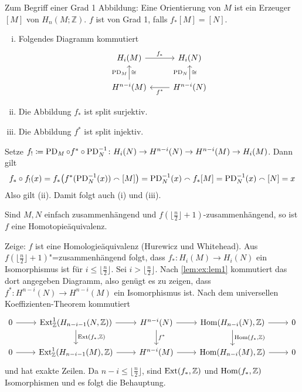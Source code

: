 \begin{erinnerung}
	Zum Begriff einer Grad 1 Abbildung: Eine Orientierung von $M$ ist ein Erzeuger $[M]$ von $H_n(M;\mathbb{Z})$. 
	$f$ ist von Grad 1, falls $f_*[M]=[N]$.
\end{erinnerung}

\begin{lemma}[label=lem:ex:lem1]
	\begin{enumerate}[(i)]
		\item Folgendes Diagramm kommutiert
		\[
			\begin{tikzcd}
				H_i(M) \rar["f_*"] & H_i(N) \\
				H^{n-i}(M) \uar["\PD_M","\cong"'] & H^{n-i}(N) \lar["f^*"] \uar["\PD_N","\cong"']
			\end{tikzcd}
		\]
		\item Die Abbildung $f_*$ ist split surjektiv.
		\item Die Abbildung $f^*$ ist split injektiv.
	\end{enumerate}
\end{lemma}
\begin{beweis}
	Setze $f_! \coloneqq \PD_M \circ f^* \circ  \PD^{-1}_N \colon H_i(N) \to H^{n-i}(N) \to H^{n-i}(M) \to H_i(M)$.
	Dann gilt 
	\[
		f_* \circ f_!(x) = f_* \enbrace[\big]{f^* (\PD^{-1}_N(x)) \capp [M]} = \PD_N^{-1}(x) \capp f_*[M] = \PD_N^{-1}(x) \capp [N] = x
	\]
	Also gilt (ii).
	Damit folgt auch (i) und (iii).
\end{beweis}

\begin{proposition}
	Sind $M,N$ einfach zusammenhängend und $f(\lfloor \frac{n}{2}\rfloor +1)$-zusammenhängend, so ist $f$ eine Homotopieäquivalenz.
\end{proposition}
\begin{beweis}
	Zeige: $f$ ist eine Homologieäquivalenz (Hurewicz und Whitehead).
	Aus $f(\lfloor \frac{n}{2}\rfloor +1)$"=zusammenhängend folgt, dass $f_* \colon H_i(M) \to H_i(N)$ ein Isomorphismus ist für $i \le \lfloor \frac{n}{2} \rfloor$.
	Sei $i > \lfloor \frac{n}{2} \rfloor$.
	Nach \autoref{lem:ex:lem1} kommutiert das dort angegeben Diagramm, also genügt es zu zeigen, dass $f^* \colon H^{n-i}(N) \to H^{n-i}(M)$ ein Isomorphismus ist.
	Nach dem universellen Koeffizienten-Theorem kommutiert
	\[
		\begin{tikzcd}
			0 \rar & \Ext^1_\mathbb{Z} \enbrace*{H_{n-i-1}(N,\mathbb{Z})} \rar \dar["{\Ext(f_*,\mathbb{Z})}"] & H^{n-i}(N) \dar["f^*"] \rar & \Hom \enbrace*{H_{n-i}(N),\mathbb{Z}} \rar \dar["{\Hom(f_*,\mathbb{Z})}"]& 0 \\
			0 \rar & \Ext^1_\mathbb{Z} \enbrace*{H_{n-i-1}(M),\mathbb{Z}} \rar & H^{n-i}(M) \rar & \Hom \enbrace*{H_{n-i}(M),\mathbb{Z}} \rar & 0
		\end{tikzcd}
	\]
	und hat exakte Zeilen.
	Da $n-i \le \lfloor \frac{n}{2}\rfloor$, sind $\Ext(f_*,\mathbb{Z})$ und $\Hom(f_*,\mathbb{Z})$ Isomorphismen und es folgt die Behauptung.
\end{beweis}


